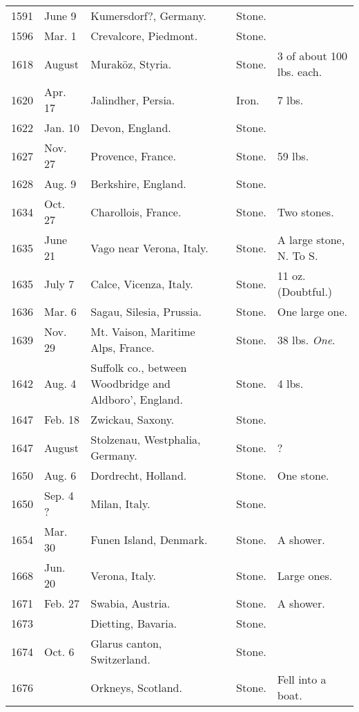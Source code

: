 \documentclass[a4paper, 12pt, oneside]{article}
\begin{document}
\begin{center}
\begin{longtable}{|p{10mm}|p{15mm}|p{32mm}|p{13mm}|p{13mm}|p{26mm}|}
        1591 & June 9 & Kumersdorf?, Germany. & ~ & Stone. & ~ \\
        1596 & Mar. 1 & Crevalcore, Piedmont. & ~ & Stone. & ~ \\
        1618 & August & Muraköz, Styria. & ~ & Stone. & 3 of about 100 lbs. each. \\
        1620 & Apr. 17 & Jalindher, Persia. & ~ & Iron. & 7 lbs. \\
        1622 & Jan. 10 & Devon, England. & ~ & Stone. & ~ \\
        1627 & Nov. 27 & Provence, France. & ~ & Stone. & 59 lbs. \\
        1628 & Aug. 9 & Berkshire, England. & ~ & Stone. & ~ \\
        1634 & Oct. 27 & Charollois, France. & ~ & Stone. & Two stones. \\
        1635 & June 21 & Vago near Verona, Italy. & ~ & Stone. & A large stone, N. To S. \\
        1635 & July 7 & Calce, Vicenza, Italy. & ~ & Stone. & 11 oz. (Doubtful.) \\
        1636 & Mar. 6 & Sagau, Silesia, Prussia. & ~ & Stone. & One large one. \\
        1639 & Nov. 29 & Mt. Vaison, Maritime Alps, France. & ~ & Stone. & 38 lbs. \emph{One}. \\
        1642 & Aug. 4 & Suffolk co., between Woodbridge and Aldboro’, England. & ~ & Stone. & 4 lbs. \\
        1647 & Feb. 18 & Zwickau, Saxony. & ~ & Stone. & ~ \\
        1647 & August & Stolzenau, Westphalia, Germany. & ~ & Stone. & ? \\
        1650 & Aug. 6 & Dordrecht, Holland. & ~ & Stone. & One stone. \\
        1650 & Sep. 4 ? & Milan, Italy. & ~ & Stone. & ~ \\
        1654 & Mar. 30 & Funen Island, Denmark. & ~ & Stone. & A shower. \\
        1668 & Jun. 20 & Verona, Italy. & ~ & Stone. & Large ones. \\
        1671 & Feb. 27 & Swabia, Austria. & ~ & Stone. & A shower. \\
        1673 & ~ & Dietting, Bavaria. & ~ & Stone. & ~ \\
        1674 & Oct. 6 & Glarus canton, Switzerland. & ~ & Stone. & ~ \\
        1676 & ~ & Orkneys, Scotland. & ~ & Stone. & Fell into a boat. \\

\end{longtable}
\end{center}
\end{document}
